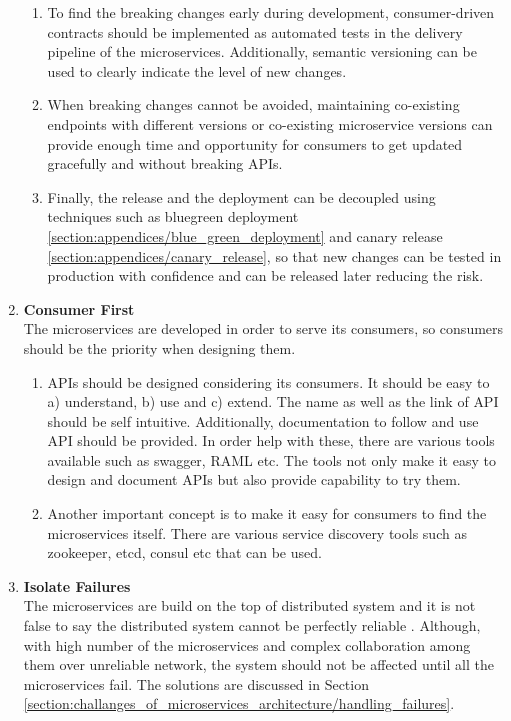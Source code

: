 \begin{enumerate}
\begin{enumerate}
\item To find the breaking changes early during development, consumer-driven contracts should be implemented as automated tests in the delivery pipeline of the microservices. Additionally, semantic versioning can be used to clearly indicate the level of new changes.
\item When breaking changes cannot be avoided, maintaining co-existing endpoints with different versions or co-existing microservice versions can provide enough time and opportunity for consumers to get updated gracefully and without breaking \acrshort{API}s.
\item Finally, the release and the deployment can be decoupled using techniques such as bluegreen deployment \ref{section:appendices/blue_green_deployment} and canary release \ref{section:appendices/canary_release}, so that new changes can be tested in production with confidence and can be released later reducing the risk.
\end{enumerate}
\item \textbf{Consumer First}\\
The microservices are developed in order to serve its consumers, so consumers should be the priority when designing them.
\begin{enumerate}
\item \acrshort{API}s should be designed considering its consumers. It should be easy to a) understand, b) use and c) extend. The name as well as the link of \acrshort{API} should be self intuitive. Additionally, documentation to follow and use \acrshort{API} should be provided. In order help with these, there are various tools available such as swagger, RAML etc. The tools not only make it easy to design and document \acrshort{API}s but also provide capability to try them.\cite{Bloch:2016aa} \cite{Blanchette:2008aa}
\item Another important concept is to make it easy for consumers to find the microservices itself. There are various service discovery tools such as zookeeper, etcd, consul etc that can be used.
\end{enumerate}
\item \textbf{Isolate Failures}\\
The microservices are build on the top of distributed system and it is not false to say the distributed system cannot be perfectly reliable \cite{Factor:2014aa}. Although, with high number of the microservices and complex collaboration among them over unreliable network, the system should not be affected until all the microservices fail. The solutions are discussed in Section \ref{section:challanges_of_microservices_architecture/handling_failures}.

\end{enumerate}
